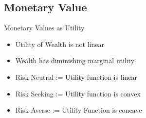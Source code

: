 \documentclass{beamer}
\begin{document}
\subsection{Monetary Value}
\begin{frame}{Monetary Values as Utility}
\begin{itemize}
   \item Utility of Wealth is not linear 
   \item Wealth has diminishing marginal utility
   \item Risk Neutral := Utility function is linear
   \item Risk Seeking := Utility function is convex
   \item Risk Averse := Utility Function is concave
\end{itemize}
\end{frame}
\end{document}
